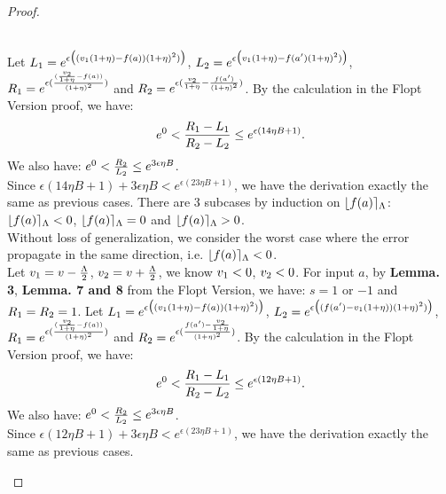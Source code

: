 \documentclass[a4paper,11pt]{article}
\begin{document}
\begin{proof}
\begin{itemize}
	\\
	Let $L_1 = e^{\epsilon 
					\big( (v_1(1 + \eta) - f(a)) (1 + \eta)^2) \big)}$,
	$L_2 = e^{\epsilon 
					\big(v_1(1 + \eta) - f(a') (1 + \eta)^2) \big)}$, 
	$R_1 = e^{\epsilon 
			(\frac{(\frac{v_2}{1 + \eta} - f(a))}{(1 + \eta)^2})}$
	and $R_2 = e^{\epsilon 
			(\frac{v_2}{1 + \eta} - \frac{f(a')}{(1 + \eta)^2})}$.
	By the calculation in the Flopt Version proof, we have:
	\[
		e^0 < \frac{R_1 - L_1}{R_2 - L_2}
		\leq e^{\epsilon(14 \eta B + 1)}.
	\]
	We also have:
	$e^0 < \frac{R_2}{L_2} \leq e^{3 \epsilon \eta B}$.
	\\
	Since $ \epsilon(14 \eta B + 1) + 3 \epsilon \eta B < e^{\epsilon(23 \eta B + 1)}$, 
	we have the derivation exactly the same as previous cases.
	There are 3 subcases by induction on $\lfloor f(a) \rceil_{\Lambda}$:
		$\lfloor f(a) \rceil_{\Lambda} < 0$, $\lfloor f(a) \rceil_{\Lambda} = 0$ and $\lfloor f(a) \rceil_{\Lambda} > 0$. 
		\\
		Without loss of generalization, we consider the worst case where the error propagate in the same direction, i.e. $\lfloor f(a) \rceil_{\Lambda} < 0$.
		\\
		Let $v_1 = v - \frac{\Lambda}{2}$, $v_2 = v + \frac{\Lambda}{2}$, we know $v_1 < 0$, $v_2 < 0$.
		For input $a$, by \textbf{ Lemma. 3}, \textbf{ Lemma. 7 and  8} from the Flopt Version, we have:
		 $s = 1$ or $-1$ and $R_1 = R_2 = 1$.
	Let $L_1 = e^{\epsilon 
					\big( (v_1(1 + \eta) - f(a)) (1 + \eta)^2) \big)}$,
	$L_2 = e^{\epsilon 
					\big((f(a') - v_1(1 + \eta)) (1 + \eta)^2) \big)}$, 
	$R_1 = e^{\epsilon 
			(\frac{(\frac{v_2}{1 + \eta} - f(a))}{(1 + \eta)^2})}$
	and $R_2 = e^{\epsilon 
			(\frac{ f(a') - \frac{v_2}{1 + \eta}}{(1 + \eta)^2})}$.
	By the calculation in the Flopt Version proof, we have:
	\[
		e^0 < \frac{R_1 - L_1}{R_2 - L_2}
		\leq e^{\epsilon(12 \eta B + 1)} .
	\]
	We also have:
	$e^0 < \frac{R_2}{L_2} \leq e^{3\epsilon \eta B}$.
	\\
	Since $ \epsilon(12 \eta B + 1) + 3 \epsilon \eta B < e^{\epsilon(23 \eta B + 1)}$, 
	we have the derivation exactly the same as previous cases.
\end{itemize}


\end{proof}

\newpage


\end{document}

